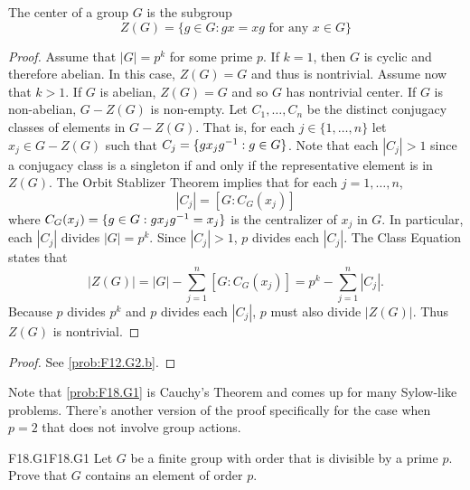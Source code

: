\documentclass[../AlgebraQualSolutions.tex]{subfiles}
\begin{document}
    The center of a group $G$ is the subgroup
        \[Z(G) = \{g \in G: gx = xg \textrm{ for any $x \in G$} \} \]
    
    \begin{proof}
    Assume that $|G| = p^k$ for some prime $p$. If $k = 1$, then $G$ is cyclic and therefore abelian. In this case, $Z(G) = G$ and thus is nontrivial. Assume now that $k > 1$. If $G$ is abelian, $Z(G) = G$ and so $G$ has nontrivial center. If $G$ is non-abelian, $G - Z(G)$ is non-empty. Let $C_1, \ldots, C_n$ be the distinct conjugacy classes of elements in $G - Z(G)$. That is, for each $j \in \{1, \ldots, n\}$ let $x_j \in G - Z(G)$ such that $C_j = \{gx_jg^{-1}: g \in G\}$. Note that each $|C_j| > 1$ since a conjugacy class is a singleton if and only if the representative element is in $Z(G)$. The Orbit Stablizer Theorem implies that for each $j = 1, \ldots, n$,
        \[ |C_j| =  [G: C_G(x_j)] \]
    where $C_G(x_j) = \{g \in G: gx_jg^{-1} = x_j \}$ is the centralizer of $x_j$ in $G$. In particular, each $|C_j|$ divides $|G| = p^k$. Since $|C_j| > 1$, $p$ divides each $|C_j|$. The Class Equation states that 
        \[|Z(G)| = |G| - \sum_{j=1}^n [G: C_G(x_j)] = p^k -  \sum_{j=1}^n |C_j| .\]
    Because $p$ divides $p^k$ and $p$ divides each $|C_j|$, $p$ must also divide $|Z(G)|$. Thus $Z(G)$ is nontrivial.
    \end{proof}
    
    \begin{proof}
        See \ref{prob:F12.G2.b}.
    \end{proof}
    
    Note that \ref{prob:F18.G1} is Cauchy's Theorem and comes up for many Sylow-like problems. There's another version of the proof specifically for the case when $p = 2$ that does not involve group actions.
    
        \begin{prob}{F18.G1}{F18.G1}
        Let $G$ be a finite group with order that is divisible by a prime $p$. Prove that $G$ contains an element of order $p$.
        \end{prob}
        
\end{document}
